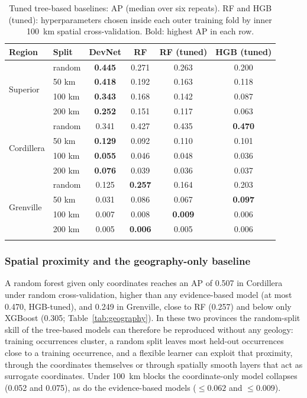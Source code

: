 \documentclass[pdflatex,sn-apa]{sn-jnl}
\begin{document}
\begin{table}[t]
\caption{Tuned tree-based baselines: AP (median over six repeats). RF and HGB (tuned): hyperparameters chosen inside each outer training fold by inner 100~km spatial cross-validation. Bold: highest AP in each row.}\label{tab:controls}
\footnotesize
\setlength{\tabcolsep}{3pt}
\begin{tabular*}{\textwidth}{@{\extracolsep\fill}llcccc}
\toprule
Region & Split & DevNet & RF & RF (tuned) & HGB (tuned) \\
\midrule
\multirow{4}{*}{Superior} & random & \textbf{0.445} & 0.271 & 0.263 & 0.200 \\
 & 50 km & \textbf{0.418} & 0.192 & 0.163 & 0.118 \\
 & 100 km & \textbf{0.343} & 0.168 & 0.142 & 0.087 \\
 & 200 km & \textbf{0.252} & 0.151 & 0.117 & 0.063 \\
\midrule
\multirow{4}{*}{Cordillera} & random & 0.341 & 0.427 & 0.435 & \textbf{0.470} \\
 & 50 km & \textbf{0.129} & 0.092 & 0.110 & 0.101 \\
 & 100 km & \textbf{0.055} & 0.046 & 0.048 & 0.036 \\
 & 200 km & \textbf{0.076} & 0.039 & 0.036 & 0.037 \\
\midrule
\multirow{4}{*}{Grenville} & random & 0.125 & \textbf{0.257} & 0.164 & 0.203 \\
 & 50 km & 0.031 & 0.086 & 0.067 & \textbf{0.097} \\
 & 100 km & 0.007 & 0.008 & \textbf{0.009} & 0.006 \\
 & 200 km & 0.005 & \textbf{0.006} & 0.005 & 0.006 \\
\botrule
\end{tabular*}
\end{table}

\subsubsection{Spatial proximity and the geography-only baseline}\label{sec:res-geography}

A random forest given only coordinates reaches an AP of 0.507 in Cordillera under random cross-validation, higher than any evidence-based model (at most 0.470, HGB-tuned), and 0.249 in Grenville, close to RF (0.257) and below only XGBoost (0.305; Table~\ref{tab:geography}). In these two provinces the random-split skill of the tree-based models can therefore be reproduced without any geology: training occurrences cluster, a random split leaves most held-out occurrences close to a training occurrence, and a flexible learner can exploit that proximity, through the coordinates themselves or through spatially smooth layers that act as surrogate coordinates. Under 100~km blocks the coordinate-only model collapses (0.052 and 0.075), as do the evidence-based models ($\leq 0.062$ and $\leq 0.009$).
\end{document}
